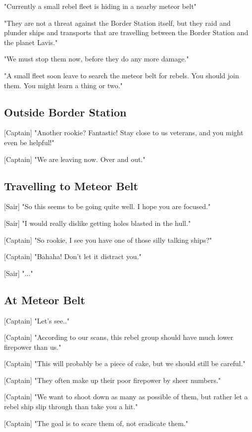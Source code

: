 \documentclass[a4paper,12pt]{article}
\begin{document}
"Currently a small rebel fleet is hiding in a nearby meteor belt"

"They are not a threat against the Border Station itself, but they raid and plunder ships
and transports that are travelling between the Border Station and the planet Lavis."

"We must stop them now, before they do any more damage." 

"A small fleet soon leave to search the meteor belt for rebels. You should join them.
You might learn a thing or two."

\subsection{Outside Border Station}

[Captain] "Another rookie? Fantastic! Stay close to us veterans, and
you might even be helpful!" 

[Captain] "We are leaving now. Over and out."

\subsection{Travelling to Meteor Belt}

[Sair] "So this seems to be going quite well. I hope you are focused."

[Sair] "I would really dislike getting holes blasted in the hull."

[Captain] "So rookie, I see you have one of those silly talking ships?" 

[Captain] "Bahaha! Don't let it distract you."

[Sair] "..."

\subsection{At Meteor Belt}

[Captain] "Let's see.." 

[Captain] "According to our scans, this rebel group should have much lower firepower than us."

[Captain] "This will probably be a piece of cake, but we should still be careful."

[Captain] "They often make up their poor firepower by sheer numbers."

[Captain] "We want to shoot down as many as possible of them, but rather let a rebel ship slip through than take
you a hit."

[Captain] "The goal is to scare them of, not eradicate them."
\end{document}
